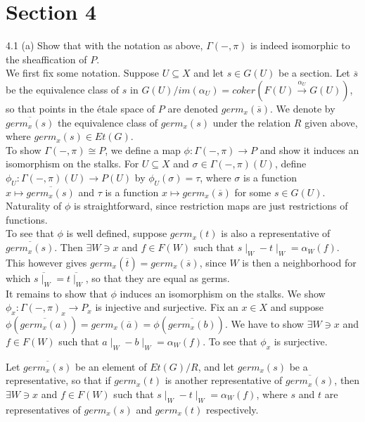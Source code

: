  \newpage
\section*{Section 4}
4.1 (a) Show that with the notation as above, $\Gamma(-, \pi)$ is indeed isomorphic to the sheaffication of $P$. \\

We first fix some notation. Suppose $U \subseteq X$ and let $s \in G(U)$ be a section. Let $\overline{s}$ be the equivalence class of $s$ in $G(U)/im(\alpha_U) = coker(F(U) \xrightarrow{\alpha_U} G(U))$, so that  points in the \'etale space of $P$ are  denoted $germ_x(\overline{s})$. We denote by $\overline{germ_x(s)}$ the equivalence class of $germ_x(s)$ under the relation $R$ given above, where $germ_x(s) \in Et(G)$. \\

To show $\Gamma(-, \pi) \cong P$, we define a map $\phi: \Gamma(-, \pi) \rightarrow P$ and show it induces an isomorphism on the stalks. For $U \subseteq X$ and $\sigma \in \Gamma(-,\pi)(U)$, define $\phi_U:\Gamma(-,\pi)(U) \rightarrow P(U)$ by $\phi_U(\sigma)=\tau$, where $\sigma$ is a function $x \mapsto \overline{germ_x(s)}$ and $\tau$ is a function $x \mapsto germ_x(\overline{s})$ for some $s \in G(U)$. Naturality of $\phi$ is straightforward, since restriction maps are just restrictions of functions. \\

To see that $\phi$ is well defined, suppose $germ_x(t)$ is also a representative of $\overline{germ_x(s)}$. Then $\exists W \ni x$ and $f \in F(W)$ such that $s\mid_W - t\mid_W = \alpha_W(f)$. This however gives $germ_x(\overline{t}) = germ_x(\overline{s})$, since $W$ is then a neighborhood for which $\overline{s\mid_W} = \overline{t\mid_W}$, so that they are equal as germs. \\

It remains to show that $\phi$ induces an isomorphism on the stalks. We show $\phi_x: \Gamma(-, \pi)_x \rightarrow P_x$ is injective and surjective. Fix an $x \in X$ and suppose $\phi(\overline{germ_x(a)})=germ_x(\overline{a})=\phi(\overline{germ_x(b)})$. We have to show $\exists W \ni x$ and $f \in F(W)$ such that $a\mid_W - b\mid_W = \alpha_W(f)$.
To see that $\phi_x$ is surjective.


\newpage


Let $\overline{germ_x(s)}$ be an element of $Et(G)/R$, and let $germ_x(s)$ be a representative, so that if $germ_x(t)$ is another representative of $\overline{germ_x(s)}$, then $\exists W \ni x$ and $f \in F(W)$ such that $s\mid_W - t\mid_W = \alpha_W(f)$, where $s$ and $t$ are representatives of $germ_x(s)$ and $germ_x(t)$ respectively.\\

